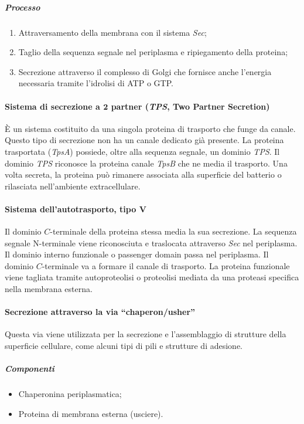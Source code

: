 				\subparagraph{Processo}
				\begin{enumerate}
					\item Attraversamento della membrana con il sistema \emph{Sec}; 
	    				\item Taglio della sequenza segnale nel periplasma e ripiegamento della proteina;
	    				\item Secrezione attraverso il complesso di Golgi che fornisce anche l'energia necessaria tramite l'idrolisi di ATP o GTP.
				\end{enumerate}

			\paragraph{Sistema di secrezione a $\mathbf{2}$ partner (\emph{TPS}, Two Partner Secretion)}
			\`E un sistema costituito da una singola proteina di trasporto che funge da canale. 
			Questo tipo di secrezione non ha un canale dedicato gi\`a presente.
			La proteina trasportata (\emph{TpsA}) possiede, oltre alla sequenza segnale, un dominio \emph{TPS}.
			Il dominio \emph{TPS} riconosce la proteina canale \emph{TpsB} che ne media il trasporto.
			Una volta secreta, la proteina pu\`o rimanere associata alla superficie del batterio o rilasciata nell'ambiente extracellulare. 

			\paragraph{Sistema dell'autotrasporto, tipo $\mathbf{V}$}
			Il dominio $C$-terminale della proteina stessa media la sua secrezione.
			La sequenza segnale N-terminale viene riconosciuta e traslocata attraverso \emph{Sec} nel periplasma.
			Il dominio interno funzionale o passenger domain passa nel periplasma.
			Il dominio $C$-terminale va a formare il canale di trasporto. 
			La proteina funzionale viene tagliata tramite autoproteolisi o proteolisi mediata da una proteasi specifica nella membrana esterna.

			\paragraph{Secrezione attraverso la via ``chaperon/usher''}
			Questa via viene utilizzata per la secrezione e l'assemblaggio di strutture della superficie cellulare, come alcuni tipi di pili e strutture di adesione. 
			
				\subparagraph{Componenti}
				\begin{itemize}
					\item Chaperonina periplasmatica; 
	    				\item Proteina di membrana esterna (usciere).
				\end{itemize}

